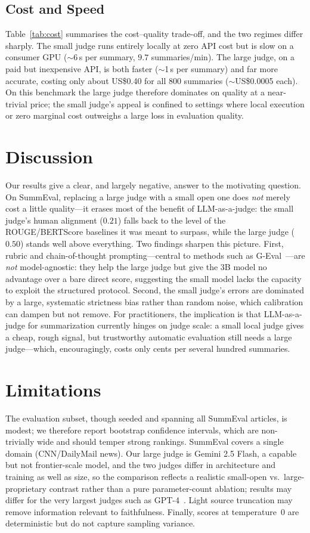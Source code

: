 \documentclass[runningheads]{llncs}
\begin{document}
\subsection{Cost and Speed}
Table~\ref{tab:cost} summarises the cost--quality trade-off, and the two regimes
differ sharply. The small judge runs entirely locally at zero API
cost but is slow on a consumer GPU ($\sim$6\,s per summary, $9.7$ summaries/min). The
large judge, on a paid but inexpensive API, is both faster ($\sim$1\,s per summary)
and far more accurate, costing only about US\$0.40 for all $800$ summaries
($\sim$US\$0.0005 each). On this benchmark the large judge therefore dominates on
quality at a near-trivial price; the small judge's appeal is confined to settings
where local execution or zero marginal cost outweighs a large loss in evaluation
quality.

\section{Discussion}
Our results give a clear, and largely negative, answer to the motivating question. On
SummEval, replacing a large judge with a small open one does \emph{not} merely cost a
little quality---it erases most of the benefit of LLM-as-a-judge: the small judge's
human alignment ($0.21$) falls back to the level of the ROUGE/BERTScore baselines it
was meant to surpass, while the large judge ($0.50$) stands well above everything.
Two findings sharpen this picture. First, rubric and chain-of-thought
prompting---central to methods such as G-Eval~\cite{liu2023geval}---are \emph{not}
model-agnostic: they help the large judge but give the 3B model no advantage over a
bare direct score, suggesting the small model lacks the capacity to exploit the
structured protocol. Second, the small judge's errors are dominated by a large,
systematic strictness bias rather than random noise, which calibration can dampen but
not remove. For practitioners, the implication is that LLM-as-a-judge for
summarization currently hinges on judge scale: a small local judge gives a cheap,
rough signal, but trustworthy automatic evaluation still needs a large judge---which,
encouragingly, costs only cents per several hundred summaries.

\section{Limitations}
The evaluation subset, though seeded and spanning all SummEval articles, is modest;
we therefore report bootstrap confidence intervals, which are non-trivially wide and
should temper strong rankings. SummEval covers a single domain (CNN/DailyMail news).
Our large judge is Gemini 2.5 Flash, a capable but not frontier-scale model, and the
two judges differ in architecture and training as well as size, so the comparison
reflects a realistic small-open vs.\ large-proprietary contrast rather than a pure
parameter-count ablation; results may differ for the very largest judges such as
GPT-4~\cite{openai2023gpt4}. Light source truncation may remove information relevant
to faithfulness. Finally, scores at temperature~0 are
deterministic but do not capture sampling variance.
\end{document}
